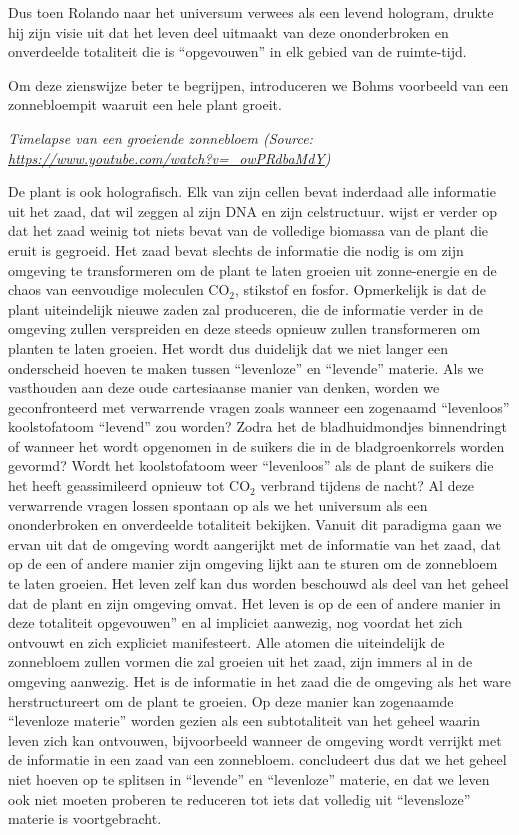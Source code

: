 \documentclass[
  11pt,
]{book}
\begin{document}
Dus toen Rolando naar het universum verwees als een levend hologram, drukte hij zijn visie uit dat het leven deel uitmaakt van deze ononderbroken en onverdeelde totaliteit die is ``opgevouwen'' in elk gebied van de ruimte-tijd.

Om deze zienswijze beter te begrijpen, introduceren we Bohms voorbeeld van een zonnebloempit waaruit een hele plant groeit.

\emph{Timelapse van een groeiende zonnebloem (Source: \url{https://www.youtube.com/watch?v=_owPRdbaMdY})}

De plant is ook holografisch. Elk van zijn cellen bevat inderdaad alle informatie uit het zaad, dat wil zeggen al zijn DNA en zijn celstructuur. \citet{bohm1980} wijst er verder op dat het zaad weinig tot niets bevat van de volledige biomassa van de plant die eruit is gegroeid. Het zaad bevat slechts de informatie die nodig is om zijn omgeving te transformeren om de plant te laten groeien uit zonne-energie en de chaos van eenvoudige moleculen CO\(_2\), stikstof en fosfor. Opmerkelijk is dat de plant uiteindelijk nieuwe zaden zal produceren, die de informatie verder in de omgeving zullen verspreiden en deze steeds opnieuw zullen transformeren om planten te laten groeien. Het wordt dus duidelijk dat we niet langer een onderscheid hoeven te maken tussen ``levenloze'' en ``levende'' materie. Als we vasthouden aan deze oude cartesiaanse manier van denken, worden we geconfronteerd met verwarrende vragen zoals wanneer een zogenaamd ``levenloos'' koolstofatoom ``levend'' zou worden? Zodra het de bladhuidmondjes binnendringt of wanneer het wordt opgenomen in de suikers die in de bladgroenkorrels worden gevormd? Wordt het koolstofatoom weer ``levenloos'' als de plant de suikers die het heeft geassimileerd opnieuw tot CO\(_2\) verbrand tijdens de nacht? Al deze verwarrende vragen lossen spontaan op als we het universum als een ononderbroken en onverdeelde totaliteit bekijken. Vanuit dit paradigma gaan we ervan uit dat de omgeving wordt aangerijkt met de informatie van het zaad, dat op de een of andere manier zijn omgeving lijkt aan te sturen om de zonnebloem te laten groeien. Het leven zelf kan dus worden beschouwd als deel van het geheel dat de plant en zijn omgeving omvat. Het leven is op de een of andere manier in deze totaliteit opgevouwen'' en al impliciet aanwezig, nog voordat het zich ontvouwt en zich expliciet manifesteert. Alle atomen die uiteindelijk de zonnebloem zullen vormen die zal groeien uit het zaad, zijn immers al in de omgeving aanwezig. Het is de informatie in het zaad die de omgeving als het ware herstructureert om de plant te groeien. Op deze manier kan zogenaamde ``levenloze materie'' worden gezien als een subtotaliteit van het geheel waarin leven zich kan ontvouwen, bijvoorbeeld wanneer de omgeving wordt verrijkt met de informatie in een zaad van een zonnebloem. \citet{bohm1980} concludeert dus dat we het geheel niet hoeven op te splitsen in ``levende'' en ``levenloze'' materie, en dat we leven ook niet moeten proberen te reduceren tot iets dat volledig uit ``levensloze'' materie is voortgebracht.
\end{document}

